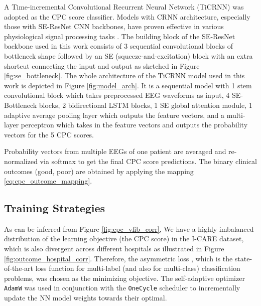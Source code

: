 A Time-incremental Convolutional Recurrent Neural Network (TiCRNN) \cite{Kang_2022_cinc2021_iop} was adopted as the CPC score classifier. Models with CRNN architecture, especially those with SE-ResNet \cite{hu2020senet} CNN backbones, have proven effective in various physiological signal processing tasks \cite{Kang_2022_cinc2021_iop, wen_cinc2022}. The building block of the SE-ResNet backbone used in this work consists of 3 sequential convolutional blocks of bottleneck shape followed by an SE (squeeze-and-excitation) block with an extra shortcut connecting the input and output as sketched in Figure \ref{fig:se_bottleneck}. The whole architecture of the TiCRNN model used in this work is depicted in Figure \ref{fig:model_arch}. It is a sequential model with 1 stem convolutional block which takes preprocessed EEG waveforms as input, 4 SE-Bottleneck blocks, 2 bidirectional LSTM blocks, 1 SE global attention module, 1 adaptive average pooling layer which outputs the feature vectors, and a multi-layer perceptron which takes in the feature vectors and outputs the probability vectors for the 5 CPC scores.





Probability vectors from multiple EEGs of one patient are averaged and re-normalized via softmax to get the final CPC score predictions. The binary clinical outcomes (good, poor) are obtained by applying the mapping \eqref{eq:cpc_outcome_mapping}.

\subsection{Training Strategies}
\label{subsec:training}

As can be inferred from Figure \ref{fig:cpc_vfib_corr}, We have a highly imbalanced distribution of the learning objective (the CPC score) in the I-CARE dataset, which is also divergent across different hospitals as illustrated in Figure \ref{fig:outcome_hospital_corr}. Therefore, the asymmetric loss \cite{ridnik2021asymmetric_loss}, which is the state-of-the-art loss function for multi-label (and also for multi-class) classification problems, was chosen as the minimizing objective. The self-adaptive optimizer \texttt{AdamW} was used in conjunction with the \texttt{OneCycle} scheduler to incrementally update the NN model weights towards their optimal.



